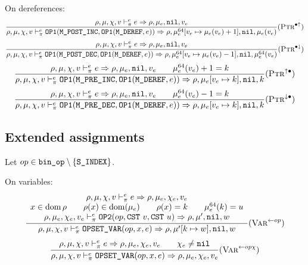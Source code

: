 On dereferences:
\[\dfrac{
    \rho,\mu,\chi,v \vdash_\pi^e e\Rightarrow \rho,\mu_e,\texttt{nil},v_e
}{\rho,\mu,\chi,v \vdash_\pi^e \texttt{OP1}(\texttt{M\_POST\_INC}, \texttt{OP1}(\texttt{M\_DEREF}, e)) \Rightarrow \rho,\mu_e^{64}[v_e\mapsto \mu_e(v_e)+1],\texttt{nil},\mu_e(v_e)} (\textsc{Ptr}^{\bullet\uparrow})\]
\[\dfrac{
    \rho,\mu,\chi,v \vdash_\pi^e e\Rightarrow \rho,\mu_e,\texttt{nil},v_e
}{\rho,\mu,\chi,v \vdash_\pi^e \texttt{OP1}(\texttt{M\_POST\_DEC}, \texttt{OP1}(\texttt{M\_DEREF}, e)) \Rightarrow \rho,\mu_e^{64}[v_e\mapsto \mu_e(v_e)-1],\texttt{nil},\mu_e^{64}(v_e)} (\textsc{Ptr}^{\bullet\downarrow})\]
\[\dfrac{
    \rho,\mu,\chi,v \vdash_\pi^e e\Rightarrow \rho,\mu_e,\texttt{nil},v_e \qquad \mu_e^{64}(v_e)+1 = k
}{\rho,\mu,\chi,v \vdash_\pi^e \texttt{OP1}(\texttt{M\_PRE\_INC}, \texttt{OP1}(\texttt{M\_DEREF}, e)) \Rightarrow \rho,\mu_e[v_e\mapsto k],\texttt{nil},k} (\textsc{Ptr}^{\uparrow \bullet})\]
\[\dfrac{
    \rho,\mu,\chi,v \vdash_\pi^e e\Rightarrow \rho,\mu_e,\texttt{nil},v_e \qquad \mu_e^{64}(v_e)-1 = k
}{\rho,\mu,\chi,v \vdash_\pi^e \texttt{OP1}(\texttt{M\_PRE\_DEC}, \texttt{OP1}(\texttt{M\_DEREF}, e)) \Rightarrow \rho,\mu_e[v_e\mapsto k],\texttt{nil},k} (\textsc{Ptr}^{\downarrow \bullet})\]

\subsection{Extended assignments}
Let \(op\in \texttt{bin\_op}\setminus \{ \texttt{S\_INDEX} \}\).

On variables:
\[\dfrac{\begin{array}{c}
    \rho,\mu,\chi,v \vdash_\pi^e e\Rightarrow \rho,\mu_e,\chi_e,v_e \\
    x\in\operatorname{dom}\rho \qquad \rho(x)\in\operatorname{dom}(\mu_e) \qquad \rho(x) = k \qquad \mu_e^{64}(k) = u \\
    \rho,\mu_e,\chi_e,v_e \vdash_\pi^e \texttt{OP2}(op, \texttt{CST}\ v, \texttt{CST}\ u) \Rightarrow \rho,\mu',\texttt{nil},w
\end{array}}{\rho,\mu,\chi,v \vdash_\pi^e \texttt{OPSET\_VAR}(op, x, e) \Rightarrow \rho,\mu'[k\mapsto w],\texttt{nil},w} (\textsc{Var}^{\gets op})\]
\[\dfrac{\begin{array}{c}
    \rho,\mu,\chi,v \vdash_\pi^e e\Rightarrow \rho,\mu_e,\chi_e,v_e \qquad \chi_e\ne\texttt{nil}\\
\end{array}}{\rho,\mu,\chi,v \vdash_\pi^e \texttt{OPSET\_VAR}(op, x, e) \Rightarrow \rho,\mu_e,\chi_e,v_e} (\textsc{Var}^{\gets op\chi})\]

